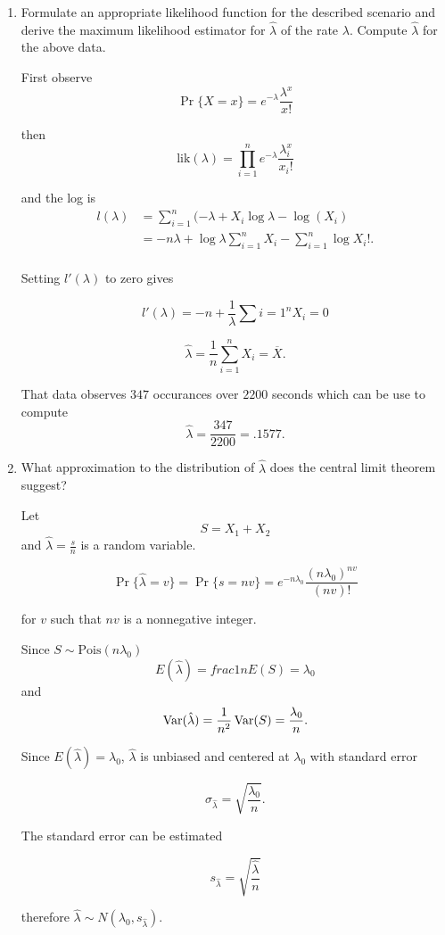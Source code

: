 \documentclass{tufte-book}
\begin{document}
\begin{enumerate}

\item Formulate an appropriate likelihood function for the described scenario and derive the maximum likelihood estimator for $\hat{\lambda}$ of the rate $\lambda$.  Compute $\hat{\lambda}$ for the above data.

First observe
\[ \Pr\{X=x\} = e^{-\lambda} \frac{\lambda^x}{x!} \]

then
\[ \text{lik}(\lambda) = \prod_{i=1}^n e^{-\lambda} \frac{\lambda^x_i}{x_i!}  \]

and the log is
\begin{align*}
l(\lambda) &= \sum_{i=1}^n(-\lambda + X_i\log \lambda - \log(X_i) \\
&= -n\lambda + \log\lambda \sum_{i=1}^n X_i - \sum_{i=1}^n \log X_i!.\\
\end{align*}

Setting $l'(\lambda)$ to zero gives

\[l'(\lambda) = -n + \frac{1}{\lambda}\sum{i=1}^n X_i = 0 \]

\[ \hat{\lambda} = \frac{1}{n}\sum_{i=1}^n X_i = \overline{X}. \]

That data observes $347$ occurances over $2200$ seconds which can be use to compute
\[ \hat{\lambda} = \frac{347}{2200} = .1577. \]

\item What approximation to the distribution of $\hat{\lambda}$ does the central limit theorem suggest?

Let
\[ S=X_1 + X_2 \]
and $\hat{\lambda}=\frac{s}{n}$ is a random variable.

\[ \Pr\{\hat{\lambda}=v \} = \Pr\{ s=nv \} = e^{-n\lambda_0}\frac{(n\lambda_0)^{nv}}{(nv)!} \]

for $v$ such that $nv$ is a nonnegative integer.

Since $S \sim \text{Pois}(n\lambda_0)$
\[ E(\hat{\lambda}) = frac{1}{n}E(S) = \lambda_0 \]
and
\[ \operatorname{Var}(\hat{\lambda}) = \frac{1}{n^2} \operatorname{Var}(S) = \frac{\lambda_0}{n}.\]

Since $E(\hat{\lambda}) = \lambda_0$, $\hat{\lambda}$ is unbiased and centered at $\lambda_0$ with standard error

\[ \sigma_{\hat{\lambda}} = \sqrt{\frac{\lambda_0}{n}}.\]

The standard error can be estimated

\[ s_{\hat{\lambda}} = \sqrt{\frac{\hat{\lambda}}{n}} \]

therefore $\hat{\lambda} \sim N(\lambda_0, s_{\hat{\lambda}})$.
\end{enumerate}
\end{document}
